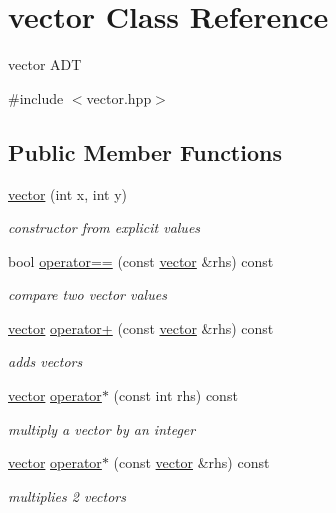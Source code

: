 \hypertarget{classvector}{}\section{vector Class Reference}
\label{classvector}


vector A\+DT  




{\ttfamily \#include $<$vector.\+hpp$>$}

\subsection*{Public Member Functions}
\begin{DoxyCompactItemize}
\item 
\hyperlink{classvector_a7fa147d3199381b9d8b32753bd1a6968}{vector} (int x, int y)
\begin{DoxyCompactList}\small\item\em constructor from explicit values \end{DoxyCompactList}\item 
bool \hyperlink{classvector_a0066b879f704f7d344ec9cd2a2f57ea3}{operator==} (const \hyperlink{classvector}{vector} \&rhs) const
\begin{DoxyCompactList}\small\item\em compare two vector values \end{DoxyCompactList}\item 
\hyperlink{classvector}{vector} \hyperlink{classvector_a9d639bc53d77f17c6ba3af1dd9549424}{operator+} (const \hyperlink{classvector}{vector} \&rhs) const
\begin{DoxyCompactList}\small\item\em adds vectors \end{DoxyCompactList}\item 
\hyperlink{classvector}{vector} \hyperlink{classvector_ad4e924ee21af1367f8724b2d94db110e}{operator$\ast$} (const int rhs) const
\begin{DoxyCompactList}\small\item\em multiply a vector by an integer \end{DoxyCompactList}\item 
\hyperlink{classvector}{vector} \hyperlink{classvector_a9ef97fde561d0998f1db1af7c9fbbff8}{operator$\ast$} (const \hyperlink{classvector}{vector} \&rhs) const
\begin{DoxyCompactList}\small\item\em multiplies 2 vectors \end{DoxyCompactList}\item 

\end{DoxyCompactItemize}
